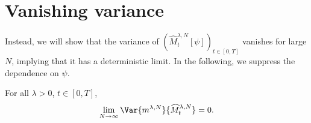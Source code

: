 \section{Vanishing variance}

Instead, we will show that the variance of \((\widehat{M}_t^{\lambda,N}[\psi])_{t\in[0,T]}\) vanishes for large \(N\), implying that it has a deterministic limit.
In the following, we suppress the dependence on \(\psi\).

\begin{proposition}\label{prop:vanishing-variance}  %
  For all \(\lambda > 0\), \(t \in [0,T]\),
  \begin{equation}
    \lim_{N\to\infty} \Var{\lawmu^{\lambda,N}}{\widehat{M}_t^{\lambda,N}} = 0.
  \end{equation}
\end{proposition}
